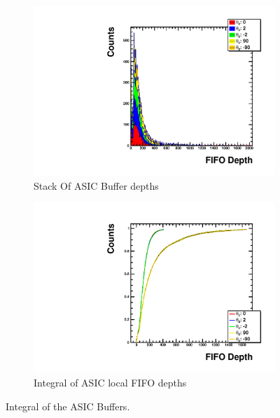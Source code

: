 \begin{figure}
\centering
\begin{subfigure}{.5\textwidth}
  \centering
  \includegraphics[width=\textwidth]{images/Const_Z180_ASIC_stack_integral_pdg12_fhc.pdf}
  \caption{Stack Of ASIC Buffer depths}
\end{subfigure}%
\begin{subfigure}{.5\textwidth}
  \centering
  \includegraphics[width=\textwidth]{images/Const_Z180_ASIC_integral_pdg12_fhc.pdf}
  \caption{Integral of ASIC local FIFO depths}
\end{subfigure}
\caption{Integral of the ASIC Buffers.}
\label{fig:example_asic_integral_value_constZpos}
\end{figure}

